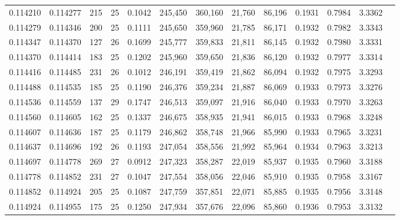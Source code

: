 \begin{tabular}{rrrrrrrrrrrrr}
0.114210 & 0.114277 & 215 &  25 &                                     0.1042 & 245,450 & 360,160 &  21,760 &  86,196 & 0.1931 & 0.7984 & 3.3362 \\
0.114279 & 0.114346 & 200 &  25 &                                     0.1111 & 245,650 & 359,960 &  21,785 &  86,171 & 0.1932 & 0.7982 & 3.3343 \\
0.114347 & 0.114370 & 127 &  26 &                                     0.1699 & 245,777 & 359,833 &  21,811 &  86,145 & 0.1932 & 0.7980 & 3.3331 \\
0.114370 & 0.114414 & 183 &  25 &                                     0.1202 & 245,960 & 359,650 &  21,836 &  86,120 & 0.1932 & 0.7977 & 3.3314 \\
0.114416 & 0.114485 & 231 &  26 &                                     0.1012 & 246,191 & 359,419 &  21,862 &  86,094 & 0.1932 & 0.7975 & 3.3293 \\
0.114488 & 0.114535 & 185 &  25 &                                     0.1190 & 246,376 & 359,234 &  21,887 &  86,069 & 0.1933 & 0.7973 & 3.3276 \\
0.114536 & 0.114559 & 137 &  29 &                                     0.1747 & 246,513 & 359,097 &  21,916 &  86,040 & 0.1933 & 0.7970 & 3.3263 \\
0.114560 & 0.114605 & 162 &  25 &                                     0.1337 & 246,675 & 358,935 &  21,941 &  86,015 & 0.1933 & 0.7968 & 3.3248 \\
0.114607 & 0.114636 & 187 &  25 &                                     0.1179 & 246,862 & 358,748 &  21,966 &  85,990 & 0.1933 & 0.7965 & 3.3231 \\
0.114637 & 0.114696 & 192 &  26 &                                     0.1193 & 247,054 & 358,556 &  21,992 &  85,964 & 0.1934 & 0.7963 & 3.3213 \\
0.114697 & 0.114778 & 269 &  27 &                                     0.0912 & 247,323 & 358,287 &  22,019 &  85,937 & 0.1935 & 0.7960 & 3.3188 \\
0.114778 & 0.114852 & 231 &  27 &                                     0.1047 & 247,554 & 358,056 &  22,046 &  85,910 & 0.1935 & 0.7958 & 3.3167 \\
0.114852 & 0.114924 & 205 &  25 &                                     0.1087 & 247,759 & 357,851 &  22,071 &  85,885 & 0.1935 & 0.7956 & 3.3148 \\
0.114924 & 0.114955 & 175 &  25 &                                     0.1250 & 247,934 & 357,676 &  22,096 &  85,860 & 0.1936 & 0.7953 & 3.3132 \\

\end{tabular}

